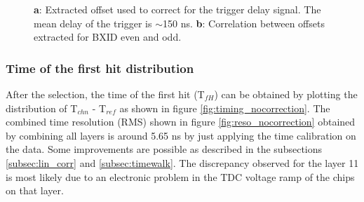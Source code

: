 \begin{figure}[htbp]
	\hfill
	\hfill
	\caption[]{\textbf{a}: Extracted offset used to correct for the trigger delay signal. The mean delay of the trigger is $\sim$150 ns. \textbf{b}: Correlation between offsets extracted for BXID even and odd.}
\end{figure}

\subsubsection{Time of the first hit distribution}
After the selection, the time of the first hit (T$_{fH}$) can be obtained by plotting the distribution of T$_{chn}$ - T$_{ref}$ as shown in figure \ref{fig:timing_nocorrection}. The combined time resolution (RMS) shown in figure \ref{fig:reso_nocorrection} obtained by combining all layers is around 5.65 ns by just applying the time calibration on the data. Some improvements are possible as described in the subsections \ref{subsec:lin_corr} and \ref{subsec:timewalk}. The discrepancy observed for the layer 11 is most likely due to an electronic problem in the TDC voltage ramp of the chips on that layer.

